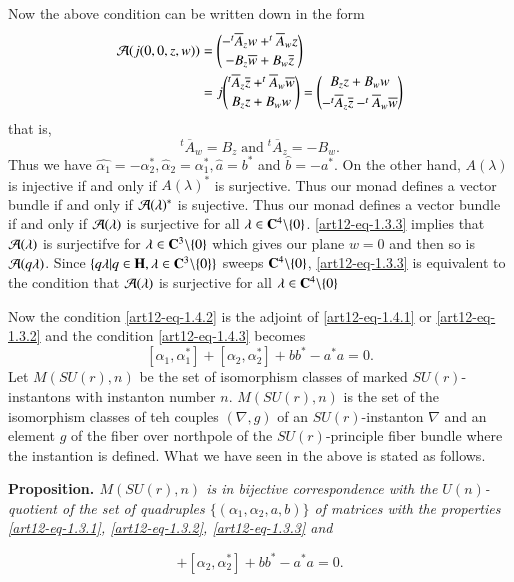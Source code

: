 Now the above condition can be written down in the form
\begin{align*}
\mathcal{A}(j(0,0,z,w)) &= \binom{-^{t}\overline{A}_{z}w +^{t}\overline{A}_{w}z}{-B_{z}\overline{w}+B_{w}\overline{z}}\\
 &= j \binom{^{t}\overline{A}_{z}\overline{z} +^{t}\overline{A}_{w}\overline{w}}{B_{z}z+B_{w}w} = \binom{B_{z}z+B_{w}w}{-^{t}\overline{A}_{z}\overline{z}-^{t}\overline{A}_{w}\overline{w}}\\
\end{align*}
that is,
$$
^{t}\overline{A}_{w} = B_{z}\; \text{and} \; ^{t}\overline{A}_{z}= -B_{w}. 
$$
Thus we have $\hat{\alpha_{1}} = -\alpha_{2}^{*}, \hat{\alpha}_{2} = \alpha_{1}^{*}, \hat{a}=b^{*}$ and $\hat{b} = -a^{*}$. On the other hand, $A(\lambda)$ is injective if and only if $A(\lambda)^{*}$ is surjective. Thus our monad defines a vector bundle if and only if $\mathcal{A}(\lambda)^{*}$ is sujective. Thus our monad defines a vector bundle if and  only if $\mathcal{A}(\lambda)$ is surjective for all $\lambda \in \mathbf{C}^{4}\backslash \{0\}$. \eqref{art12-eq-1.3.3} implies that $\mathcal{A}(\lambda)$ is surjectifve for $\lambda \in \mathbf{C}^{3}\backslash\{0\}$ which gives our plane $w=0$ and then so is $\mathcal{A}(q \lambda)$. Since $\{q \lambda | q \in \mathbf{H}, \lambda \in \mathbf{C}^{3} \backslash\{0\}\}$ sweeps $\mathbf{C}^{4} \backslash \{0\}$, \eqref{art12-eq-1.3.3} is equivalent to the condition that $\mathcal{A}(\lambda)$ is surjective for all $\lambda \in \mathbf{C}^{4}\backslash\{0\}$ 

Now the condition \eqref{art12-eq-1.4.2} is the adjoint of \eqref{art12-eq-1.4.1} or \eqref{art12-eq-1.3.2} and the condition \eqref{art12-eq-1.4.3} becomes
$$
[\alpha_{1}, \alpha_{1}^{*}] + [\alpha_{2}, \alpha_{2}^{*}] + bb^{*}-a^{*}a=0.
$$
 Let $M(SU(r), n)$ be the set of isomorphism classes of marked $SU(r)$-instantons with instanton number $n$. $M(SU(r), n)$ is the set of the isomorphism classes of teh couples $(\nabla, g)$ of an $SU(r)$-instanton $\nabla$ and an element $g$ of the fiber over northpole of the $SU(r)$-principle fiber bundle where the instantion is defined. What we have seen in the above is stated as follows.
  
\medskip
\noindent
{\bfseries {} Proposition. \label{art12-prop-1.6}}\textit{$M(SU(r),n)$ is in bijective correspondence with the $U(n)$-quotient of the set of quadruples $\{(\alpha_{1}, \alpha_{2},a,b)\}$ of matrices with the properties
\eqref{art12-eq-1.3.1}, \eqref{art12-eq-1.3.2}, \eqref{art12-eq-1.3.3} and}

\begin{equation}
[\alpha_{1}, \alpha_{1}^{*}] + [\alpha_{2}, \alpha_{2}^{*}] + bb^{*}-a^{*}a=0.\tag{1.6.1}\label{art12-eq-1.6.1}
\end{equation}

